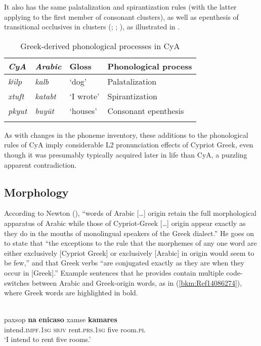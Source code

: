 \documentclass[output=paper]{langsci/langscibook}
\begin{document}
It also has the same palatalization and spirantization rules (with the latter applying to the first member of consonant clusters), as well as epenthesis of transitional occlusives in clusters (\citealt{Tsiapera1969}; \citealt{Borg1985}; \citealt{Roth2004}), as illustrated in .

\begin{table}
\begin{tabular}{>{\itshape}l>{\itshape}lll}
\lsptoprule
{\normalfont CyA} & {\normalfont Arabic} & {Gloss} & {Phonological process}\\\midrule
kʲilp & kalb & ‘dog’ & Palatalization\\
xtuft & katabt & ‘I wrote’ & Spirantization\\
pkyut & buyūt & ‘houses’ & Consonant epenthesis\\
\lspbottomrule
\end{tabular}
\caption{\label{bkm:Ref13776308}Greek-derived phonological processes in CyA\label{tab:walter:4}}
\end{table}

As with changes in the phoneme inventory, these additions to the phonological rules of CyA imply considerable L2 pronunciation effects of Cypriot Greek, even though it was presumably typically acquired later in life than CyA, a puzzling apparent contradiction.

\subsection{Morphology}

According to Newton (\citeyear[43]{Newton1964}), “words of Arabic […] origin retain the full morphological apparatus of Arabic while those of Cypriot-Greek […] origin appear exactly as they do in the mouths of monolingual speakers of the Greek dialect.” He goes on to state that “the exceptions to the rule that the morphemes of any one word are either exclusively [Cypriot Greek] or exclusively [Arabic] in origin would seem to be few,” and that Greek verbs “are conjugated exactly as they are when they occur in [Greek].” Example sentences that he provides contain multiple code-switches between Arabic and Greek-origin words, as in (\ref{bkm:Ref14086274}), where Greek words are highlighted in bold.

\ea\label{bkm:Ref14086274}
\\
\gll paxsop \textbf{na} \textbf{enicaso} xamse \textbf{kamares}\\
     intend.\textsc{impf.1sg} \textsc{sbjv} rent.\textsc{prs.1sg} five room.\textsc{pl}\\
\glt  ‘I intend to rent five rooms.’\z
\end{document}
